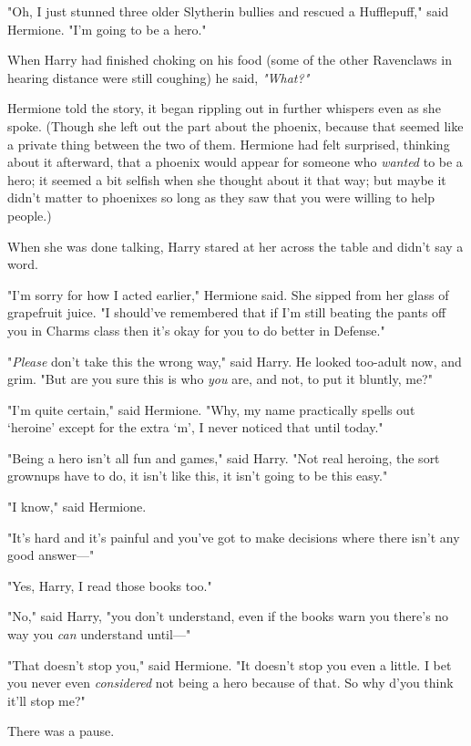 "Oh, I just stunned three older Slytherin bullies and rescued a Hufflepuff,"
said Hermione. "I'm going to be a hero."

When Harry had finished choking on his food (some of the other Ravenclaws in
hearing distance were still coughing) he said, \emph{"What?"}

Hermione told the story, it began rippling out in further whispers even as she
spoke. (Though she left out the part about the phoenix, because that seemed
like a private thing between the two of them. Hermione had felt surprised,
thinking about it afterward, that a phoenix would appear for someone who
\emph{wanted} to be a hero; it seemed a bit selfish when she thought about it
that way; but maybe it didn't matter to phoenixes so long as they saw that you
were willing to help people.)

When she was done talking, Harry stared at her across the table and didn't say
a word.

"I'm sorry for how I acted earlier," Hermione said. She sipped from her glass
of grapefruit juice. "I should've remembered that if I'm still beating the
pants off you in Charms class then it's okay for you to do better in Defense."

"\emph{Please} don't take this the wrong way," said Harry. He looked too-adult
now, and grim. "But are you sure this is who \emph{you} are, and not, to put it
bluntly, me?"

"I'm quite certain," said Hermione. "Why, my name practically spells out
`heroine' except for the extra `m', I never noticed that until today."

"Being a hero isn't all fun and games," said Harry. "Not real heroing, the sort
grownups have to do, it isn't like this, it isn't going to be this easy."

"I know," said Hermione.

"It's hard and it's painful and you've got to make decisions where there isn't
any good answer\mbox{---}"

"Yes, Harry, I read those books too."

"No," said Harry, "you don't understand, even if the books warn you there's no
way you \emph{can} understand until\mbox{---}"

"That doesn't stop you," said Hermione. "It doesn't stop you even a little. I
bet you never even \emph{considered} not being a hero because of that. So why
d'you think it'll stop me?"

There was a pause.

